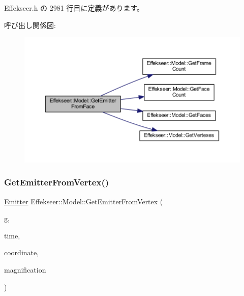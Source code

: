  Effekseer.\+h の 2981 行目に定義があります。

呼び出し関係図\+:\nopagebreak
\begin{figure}[H]
\begin{center}
\leavevmode
\includegraphics[width=350pt]{class_effekseer_1_1_model_a1bd509af3054aeee73aaf495732e3f4a_cgraph}
\end{center}
\end{figure}
\mbox{\label{class_effekseer_1_1_model_a903c0b92208cebf971846956770fb681}} 
\subsubsection{\texorpdfstring{Get\+Emitter\+From\+Vertex()}{GetEmitterFromVertex()}\hspace{0.1cm}{\footnotesize\ttfamily [1/2]}}
{\footnotesize\ttfamily \mbox{\hyperlink{struct_effekseer_1_1_model_1_1_emitter}{Emitter}} Effekseer\+::\+Model\+::\+Get\+Emitter\+From\+Vertex (\begin{DoxyParamCaption}\item[{\mbox{\hyperlink{class_effekseer_1_1_i_rand_object}{I\+Rand\+Object}} $\ast$}]{g,  }\item[{int32\+\_\+t}]{time,  }\item[{\mbox{\hyperlink{namespace_effekseer_ac8508f8823c5fcf36aac5d2ddee23765}{Coordinate\+System}}}]{coordinate,  }\item[{float}]{magnification }\end{DoxyParamCaption})\hspace{0.3cm}{\ttfamily [inline]}}



